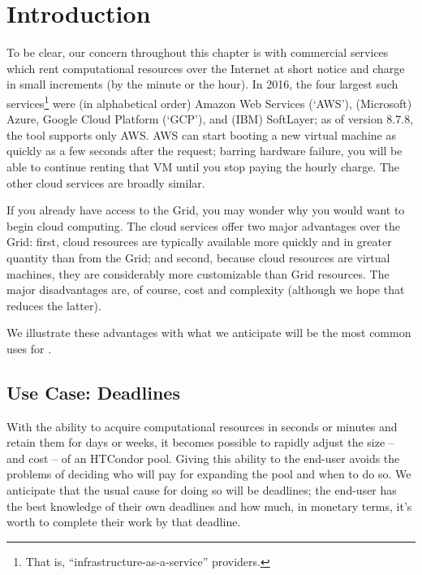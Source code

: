 \section{Introduction}\label{sec:clouds-introduction}

To be clear, our concern throughout this chapter is with commercial services
which rent computational resources over the Internet at short notice and
charge in small increments (by the minute or the hour).  In 2016, the four
largest such services\footnote{That is, ``infrastructure-as-a-service''
providers.} were (in alphabetical order) Amazon Web Services (`AWS'),
(Microsoft) Azure, Google Cloud Platform (`GCP'), and (IBM) SoftLayer; as of
version 8.7.8, the  tool supports only AWS.  AWS can start
booting a new virtual machine as quickly as a few seconds after the request;
barring hardware failure, you will be able to continue renting that VM until
you stop paying the hourly charge.  The other cloud services are broadly
similar.

If you already have access to the Grid, you may wonder why you would want to
begin cloud computing.  The cloud services offer two major advantages over
the Grid: first, cloud resources are typically available more quickly and
in greater quantity than from the Grid; and second, because cloud resources are
virtual machines, they are considerably more customizable than Grid resources.
The major disadvantages are, of course, cost and complexity (although we
hope that  reduces the latter).

We illustrate these advantages with what we anticipate will be the most
common uses for .

\subsection{Use Case: Deadlines}

With the ability to acquire computational resources in seconds or minutes
and retain them for days or weeks, it becomes possible to rapidly adjust
the size -- and cost -- of an HTCondor pool.  Giving this ability to the
end-user avoids the problems of deciding who will pay for expanding the
pool and when to do so.  We anticipate that the usual cause for doing so
will be deadlines; the end-user has the best knowledge of their own
deadlines and how much, in monetary terms, it's worth to complete their
work by that deadline.


